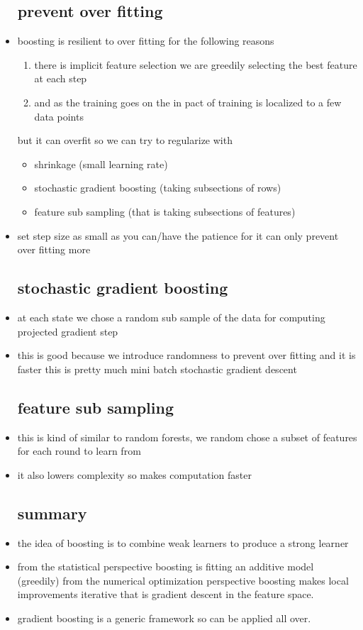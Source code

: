 \documentclass{article}
\begin{document}
\begin{itemize}
\subsection{prevent over fitting}
\item boosting is resilient to over fitting for the following reasons 
\begin{enumerate}
    \item there is implicit feature selection we are greedily selecting the best feature at each step 
    \item and as the training goes on the in pact of training is localized to a few data points 
\end{enumerate}
\itme but it can overfit so we can try to regularize with 
\begin{itemize}
    \item shrinkage (small learning rate)
    \item stochastic gradient boosting (taking subsections of rows)
    \item feature sub sampling (that is taking subsections of features)
\end{itemize}
\item set step size as small as you can/have the patience for it can only prevent over fitting more
\subsection{stochastic gradient boosting }
\item at each state we chose a random sub sample of the data for computing projected gradient step 
\item this is good because we introduce randomness to prevent over fitting  and it is faster 
\itme this is pretty much mini batch stochastic gradient descent 
\subsection{feature sub sampling}
\item this is kind of similar to random forests, we random chose a subset of features for each round to learn from 
\item it also lowers complexity so makes computation faster

\subsection{summary}
\item the idea of boosting is to combine weak learners to produce a strong learner 
\item from the statistical perspective boosting is fitting an additive model (greedily) 
\itme from the numerical optimization perspective boosting makes local improvements iterative that is gradient descent in the feature space. 
\item gradient boosting is a generic framework so can be applied all over. 


\end{itemize}
\end{document}
